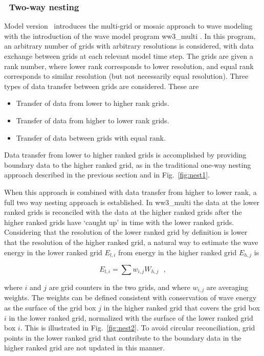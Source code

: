 


\vssub
\subsubsection{~Two-way nesting} \label{sub:two_way}
\vssub

Model version \WWver\ introduces the multi-grid or mosaic approach to wave
modeling with the introduction of the wave model program {\file ww3\_multi}
\citep{tol:Vict06a, tol:MMAB07b, tol:OMOD08b}. In this program, an arbitrary
number of grids with arbitrary resolutions is considered, with data exchange
between grids at each relevant model time step. The grids are given a rank
number, where lower rank corresponds to lower resolution, and equal rank
corresponds to similar resolution (but not necessarily equal resolution).
Three types of data transfer between grids are considered. These are

\begin{itemize}
\item Transfer of data from lower to higher rank grids.
\item Transfer of data from higher to lower rank grids.
\item Transfer of data between grids with equal rank.
\end{itemize}

Data transfer from lower to higher ranked grids is accomplished by providing
boundary data to the higher ranked grid, as in the traditional one-way nesting
approach described in the previous section and in Fig.~\ref{fig:nest1}.

When this approach is combined with data transfer from higher to lower rank, a
full two way nesting approach is established. In {\file ww3\_multi} the data
at the lower ranked grids is reconciled with the data at the higher ranked
grids after the higher ranked grids have `caught up' in time with the lower
ranked grids.  Considering that the resolution of the lower ranked grid by
definition is lower that the resolution of the higher ranked grid, a natural
way to estimate the wave energy in the lower ranked grid $E_{l,i}$ from energy
in the higher ranked grid $E_{h,j}$ is

\begin{equation}
E_{l,i} = \sum w_{i,j} W_{h,j} \:\:\: , \label{eq:nest_hg1}
\end{equation}

\noindent
where $i$ and $j$ are grid counters in the two grids, and where $w_{i,j}$ are
averaging weights. The weights can be defined consistent with conservation of
wave energy as the surface of the grid box $j$ in the higher ranked grid that
covers the grid box $i$ in the lower ranked grid, normalized with the surface
of the lower ranked grid box $i$. This is illustrated in Fig.~\ref{fig:nest2}.
To avoid circular reconciliation, grid points in the lower ranked grid that
contribute to the boundary data in the higher ranked grid are not updated in
this manner.

